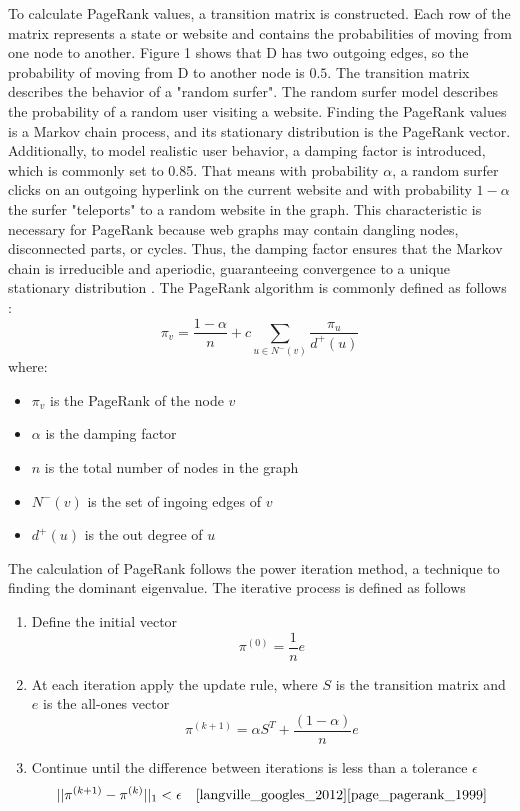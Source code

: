 To calculate PageRank values, a transition matrix is constructed. Each row of the matrix represents a state or website and contains the probabilities of moving from one node to another. Figure 1 shows that D has two outgoing edges, so the probability of moving from D to another node is $0.5$. The transition matrix describes the behavior of a "random surfer". The random surfer model describes the probability of a random user visiting a website. Finding the PageRank values is a Markov chain process, and its stationary distribution is the PageRank vector. Additionally, to model realistic user behavior, a damping factor is introduced, which is commonly set to 0.85. That means with probability $\alpha$, a random surfer clicks on an outgoing hyperlink on the current website and with probability $1-\alpha$ the surfer "teleports" to a random website in the graph. This characteristic is necessary for PageRank because web graphs may contain dangling nodes, disconnected parts, or cycles. Thus, the damping factor ensures that the Markov chain is irreducible and aperiodic, guaranteeing convergence to a unique stationary distribution \cite{langville_googles_2012}. 
The PageRank algorithm is commonly defined as follows \cite{chebolu_pagerank_2008}:
\begin{equation}
    \pi_v = \frac{1-\alpha}{n}+c\sum_{u\in N^-(v)}\frac{\pi_u}{d^+(u)} 
\end{equation} 
where: 
\begin{itemize}
    \item $\pi_v$ is the PageRank of the node $v$
    \item $\alpha$ is the damping factor
    \item $n$ is the total number of nodes in the graph
    \item $N^-(v)$ is the set of ingoing edges of $v$
    \item $d^+(u)$ is the out degree of $u$
\end{itemize} 
The calculation of PageRank follows the power iteration method, a technique to finding the dominant eigenvalue. The iterative process is defined as follows
\begin{enumerate}
    \item Define the initial vector 
    \begin{equation}
        \pi^{(0)}=\frac{1}{n}e
    \end{equation}
    \item At each iteration apply the update rule, where $S$ is the transition matrix and $e$ is the all-ones vector
    \begin{equation}
        \pi^{(k+1)} = \alpha S^T+ \frac{(1-\alpha)}{n}e
    \end{equation}
    \item Continue until the difference between iterations is less than a tolerance $\epsilon$
    \begin{equation}
        ||\pi^{(k+1)}-\pi^{(k)}||_1<\epsilon \quad \text{\cite{langville_googles_2012}\cite{page_pagerank_1999}}
    \end{equation}
    
\end{enumerate}
